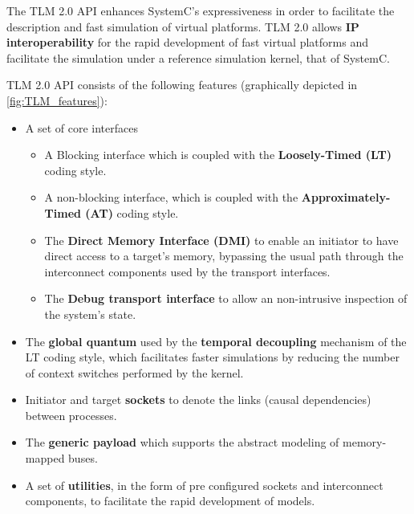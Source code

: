 \documentclass[12pt,twoside]{article}
\begin{document}
The TLM 2.0 API enhances SystemC's expressiveness in order to facilitate the description and fast simulation of virtual platforms.
TLM 2.0 allows \textbf{IP interoperability} for the rapid development of fast virtual platforms and facilitate the simulation under a reference simulation kernel, that of SystemC.

TLM 2.0 API \cite{OpenSystemCInitiative2009} consists of the following features (graphically depicted in \ref{fig:TLM_features}):
\begin{itemize}
\item A set of core interfaces
\begin{itemize}
\item A Blocking interface which is coupled with the \textbf{Loosely-Timed (LT)} coding style.
\item A non-blocking interface, which is coupled with the \textbf{Approximately-Timed (AT)} coding style.
\item The \textbf{Direct Memory Interface (DMI)} to enable an initiator to have direct access to a target's memory, bypassing the usual path through the interconnect components used by the transport interfaces.
\item The \textbf{Debug transport interface} to allow an non-intrusive inspection of the system's state.
\end{itemize}
\item The \textbf{global quantum} used by the \textbf{temporal decoupling} mechanism of the LT coding style, which facilitates faster simulations by reducing the number of context switches performed by the kernel.
\item Initiator and target \textbf{sockets} to denote the links (causal dependencies) between processes.
\item The \textbf{generic payload} which supports the abstract modeling of memory-mapped buses.
\item A set of \textbf{utilities}, in the form of pre configured sockets and interconnect components, to facilitate the rapid development of models.
\end{itemize}
\end{document}

